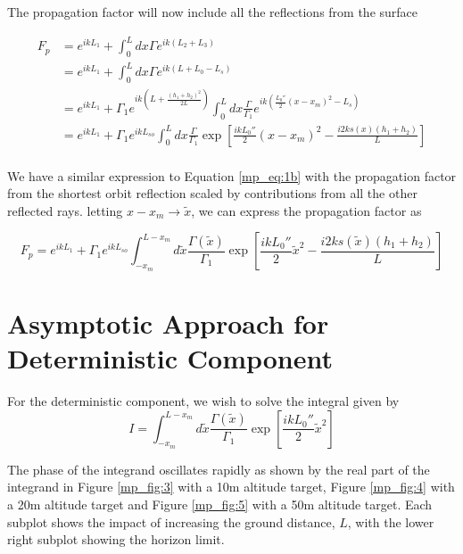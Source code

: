 The propagation factor will now include all the reflections from the surface

\begin{equation}
\begin{aligned}
F_p &= e^{ikL_1} + \int_0^Ldx\Gamma  e^{ik(L_2+L_3)}\\
&= e^{ikL_1} + \int_0^Ldx\Gamma  e^{ik(L+L_0-L_s)}\\
&= e^{ikL_1} +  \Gamma_1e^{ik(L+\frac{(h_1+h_2)^2}{2L})}\int_0^Ldx\frac{\Gamma}{\Gamma_1} e^{ik(\frac{L_0''}{2}(x-x_m)^2-L_s)}\\
&= e^{ikL_1} + \Gamma_1e^{ikL_{so}}\int_0^Ldx\frac{\Gamma}{\Gamma_1} \exp\left[\frac{ikL_0''}{2}(x-x_m)^2 - \frac{i2ks(x)(h_1+h_2)}{L}\right]\\
\end{aligned}
\label{mp_eq:20}
\end{equation}

We have a similar expression to Equation \ref{mp_eq:1b} with the propagation factor from the shortest orbit reflection scaled by contributions from all the other reflected rays. letting $x-x_m \rightarrow \tilde{x}$, we can express the propagation factor as

\begin{equation}
\boxed{F_p = e^{ikL_1} + \Gamma_1 e^{ikL_{so}}\int_{-x_m}^{L-x_m}d\tilde{x} \frac{\Gamma(\tilde{x})}{\Gamma_1}\exp\left[\frac{ikL_0''}{2}\tilde{x}^2 - \frac{i2ks(\tilde{x})(h_1+h_2)}{L}\right]}
\label{mp_eq:21}
\end{equation}

\section{Asymptotic Approach for Deterministic Component}
For the deterministic component, we wish to solve the integral given by
\begin{equation}
I = \int_{-x_m}^{L-x_m}d\tilde{x} \frac{\Gamma(\tilde{x})}{\Gamma_1}\exp\left[\frac{ikL_0''}{2}\tilde{x}^2\right]
\label{mp_eq:22}
\end{equation}

The phase of the integrand oscillates rapidly as shown by the real part of the integrand in Figure \ref{mp_fig:3} with a 10m altitude target, Figure \ref{mp_fig:4} with a 20m altitude target and Figure \ref{mp_fig:5} with a 50m altitude target. Each subplot shows the impact of increasing the ground distance, $L$, with the lower right subplot showing the horizon limit.

